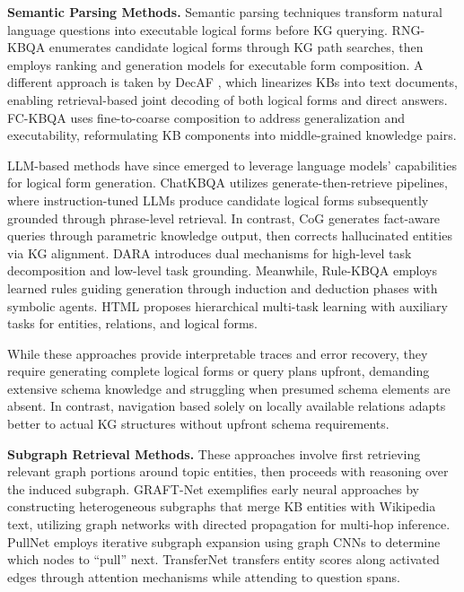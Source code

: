 \documentclass[sigconf]{acmart}
\begin{document}
\noindent \textbf{Semantic Parsing Methods. } 
Semantic parsing techniques transform natural language questions into executable logical forms before KG querying. RNG-KBQA \citep{ye2021rng} enumerates candidate logical forms through KG path searches, then employs ranking and generation models for executable form composition. A different approach is taken by DecAF \citep{yu2022decaf}, which linearizes KBs into text documents, enabling retrieval-based joint decoding of both logical forms and direct answers. FC-KBQA \citep{zhang2023fc} uses fine-to-coarse composition to address generalization and executability, reformulating KB components into middle-grained knowledge pairs.

\begin{sloppypar}
LLM-based methods have since emerged to leverage language models' capabilities for logical form generation. ChatKBQA \citep{luo2024chatkbqa} utilizes generate-then-retrieve pipelines, where instruction-tuned LLMs produce candidate logical forms subsequently grounded through phrase-level retrieval. In contrast, CoG \citep{zhao2025correcting} generates fact-aware queries through parametric knowledge output, then corrects hallucinated entities via KG alignment. DARA \citep{fang2024dara} introduces dual mechanisms for high-level task decomposition and low-level task grounding. Meanwhile, Rule-KBQA \citep{zhang2025rule} employs learned rules guiding generation through induction and deduction phases with symbolic agents. HTML \citep{wulamu2025html} proposes hierarchical multi-task learning with auxiliary tasks for entities, relations, and logical forms.
\end{sloppypar}

While these approaches provide interpretable traces and error recovery, they require generating complete logical forms or query plans upfront, demanding extensive schema knowledge and struggling when presumed schema elements are absent. In contrast, navigation based solely on locally available relations adapts better to actual KG structures without upfront schema requirements.

\noindent \textbf{Subgraph Retrieval Methods.}
These approaches involve first retrieving relevant graph portions around topic entities, then proceeds with reasoning over the induced subgraph. GRAFT-Net \citep{sun2018open} exemplifies early neural approaches by constructing heterogeneous subgraphs that merge KB entities with Wikipedia text, utilizing graph networks with directed propagation for multi-hop inference. PullNet \citep{sun2019pullnet} employs iterative subgraph expansion using graph CNNs to determine which nodes to ``pull'' next. TransferNet \citep{shi2021transfernet} transfers entity scores along activated edges through attention mechanisms while attending to question spans.
\end{document}
